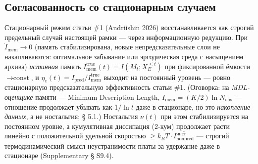\documentclass[pdflatex,sn-mathphys-ay]{sn-jnl}
\begin{document}
\subsection{Согласованность со стационарным случаем}\label{ux441ux43eux433ux43bux430ux441ux43eux432ux430ux43dux43dux43eux441ux442ux44c-ux441ux43e-ux441ux442ux430ux446ux438ux43eux43dux430ux440ux43dux44bux43c-ux441ux43bux443ux447ux430ux435ux43c}



Стационарный режим статьи \#1 (Andriishin 2026) восстанавливается как строгий предельный случай настоящей рамки --- через информационную редукцию. При \(\dot I_{\text{mem}} \to 0\) (память стабилизирована, новые непредсказательные слои не накапливаются: оптимальное забывание или эргодическая среда с насыщением архива) \emph{истинная} память \(I_{\text{mem}}^{\text{true}}(t) = I(M_t; X_E^{\le t})\) при фиксированной ёмкости \(\to \text{const}\), и \(\eta_v(t) = I_{\text{pred}}/I_{\text{mem}}^{\text{true}}\) выходит на постоянный уровень --- ровно стационарную предсказательную эффективность статьи \#1. (Оговорка: на \emph{MDL-оценщике} памяти --- Minimum Description Length, \(I_{\text{mem}} = (K/2)\ln N_{\text{obs}}\) --- отношение продолжает убывать как \(1/\ln t\) даже в стационаре, но это \emph{накопление данных}, а не ностальгия; § 5.1.) Ностальгия \(\nu(t)\) при этом стабилизируется на постоянном уровне, а кумулятивная диссипация (2-кум) продолжает расти линейно с положительной удельной скоростью \(\ge k_B T \cdot \overline{I_{\text{nonpred}}^{\text{инст}}}\) --- строгий термодинамический смысл неустранимости платы за удержание даже в стационаре (Supplementary § S9.4).
\end{document}
